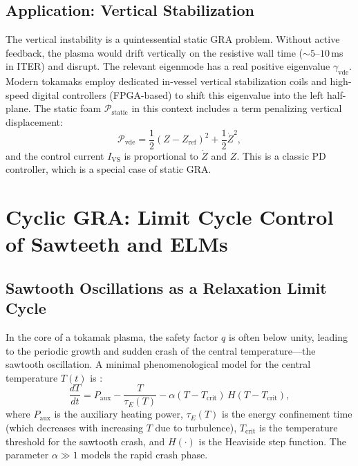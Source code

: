 \documentclass[12pt,a4paper]{article}
\begin{document}
\subsection{Application: Vertical Stabilization}

The vertical instability is a quintessential static GRA problem. Without active feedback, the plasma would drift vertically on the resistive wall time ($\sim5$--$10$\,ms in ITER) and disrupt. The relevant eigenmode has a real positive eigenvalue $\gamma_{\text{vde}}$. Modern tokamaks employ dedicated in-vessel vertical stabilization coils and high-speed digital controllers (FPGA-based) to shift this eigenvalue into the left half-plane. The static foam $\mathcal{P}_{\text{static}}$ in this context includes a term penalizing vertical displacement:
\begin{equation}
\mathcal{P}_{\text{vde}} = \frac{1}{2} (Z - Z_{\text{ref}})^2 + \frac{1}{2} \dot{Z}^2,
\end{equation}
and the control current $I_{\text{VS}}$ is proportional to $\dot{Z}$ and $Z$. This is a classic PD controller, which is a special case of static GRA.

\section{Cyclic GRA: Limit Cycle Control of Sawteeth and ELMs}
\label{sec:cyclic}

\subsection{Sawtooth Oscillations as a Relaxation Limit Cycle}

In the core of a tokamak plasma, the safety factor $q$ is often below unity, leading to the periodic growth and sudden crash of the central temperature—the sawtooth oscillation. A minimal phenomenological model for the central temperature $T(t)$ is \cite{Graves2005}:
\begin{equation}
\frac{dT}{dt} = P_{\text{aux}} - \frac{T}{\tau_E(T)} - \alpha (T - T_{\text{crit}}) \, H(T - T_{\text{crit}}),
\label{eq:sawtooth_ode}
\end{equation}
where $P_{\text{aux}}$ is the auxiliary heating power, $\tau_E(T)$ is the energy confinement time (which decreases with increasing $T$ due to turbulence), $T_{\text{crit}}$ is the temperature threshold for the sawtooth crash, and $H(\cdot)$ is the Heaviside step function. The parameter $\alpha \gg 1$ models the rapid crash phase.
\end{document}
